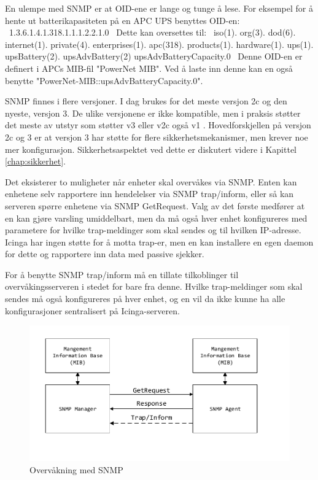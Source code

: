 En ulempe med SNMP er at OID-ene er lange og tunge å lese. For eksempel for å hente ut batterikapasiteten på en APC UPS benyttes OID-en:
\
1.3.6.1.4.1.318.1.1.1.2.2.1.0
\
Dette kan oversettes til:
\
iso(1). org(3). dod(6). internet(1). private(4). enterprises(1). apc(318). products(1). hardware(1). ups(1). upsBattery(2). upsAdvBattery(2) upsAdvBatteryCapacity.0
\
Denne OID-en er definert i APCs MIB-fil "PowerNet MIB". Ved å laste inn denne kan en også benytte "PowerNet-MIB::upsAdvBatteryCapacity.0".

SNMP finnes i flere versjoner. I dag brukes for det meste versjon 2c og den nyeste, versjon 3. De ulike versjonene er ikke kompatible, men i praksis støtter det meste av utstyr som støtter v3 eller v2c også v1 \cite{rfc3584}. Hovedforskjellen på versjon 2c og 3 er at versjon 3 har støtte for flere sikkerhetsmekanismer, men krever noe mer konfigurasjon. Sikkerhetsaspektet ved dette er diskutert videre i Kapittel \ref{chap:sikkerhet}.

Det eksisterer to muligheter når enheter skal overvåkes via SNMP. Enten kan enhetene selv rapportere inn hendelelser via SNMP trap/inform, eller så kan serveren spørre enhetene via SNMP GetRequest. Valg av det første medfører at en kan gjøre varsling umiddelbart, men da må også hver enhet konfigureres med parametere for hvilke trap-meldinger som skal sendes og til hvilken IP-adresse. Icinga har ingen støtte for å motta trap-er, men en kan installere en egen daemon for dette og rapportere inn data med passive sjekker. 

For å benytte SNMP trap/inform må en tillate tilkoblinger til overvåkingsserveren i stedet for bare fra denne. Hvilke trap-meldinger som skal sendes må også konfigureres på hver enhet, og en vil da ikke kunne ha alle konfigurasjoner sentralisert på Icinga-serveren.

\begin{figure}[H]
    \centering
    \includegraphics{img/SNMP}
    \caption{Overvåkning med SNMP}
    \label{SNMP}
\end{figure}

